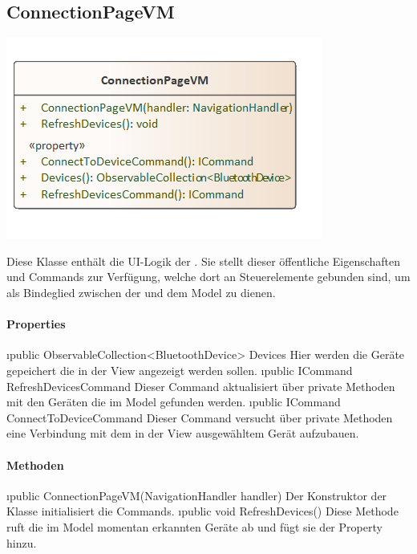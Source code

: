 \documentclass[../entwurf.tex]{subfiles}
\begin{document}
\subsection{ConnectionPageVM}
\begin{minipage}{0.5\textwidth}
\includegraphics[scale=0.75]{../graphics/vm_klassen/ConnectionPageVM.png}
\end{minipage}
\begin{minipage}{0.5\textwidth}
Diese Klasse enthält die UI-Logik der . Sie stellt dieser öffentliche Eigenschaften und Commands zur Verfügung, welche dort an Steuerelemente gebunden sind, um als Bindeglied zwischen der  und dem Model zu dienen.
\end{minipage}
\paragraph{Properties}
\begin{itemize}
	\i{public ObservableCollection<BluetoothDevice> Devices} Hier werden die Geräte gepeichert die in der View angezeigt werden sollen. 
	\i{public ICommand RefreshDevicesCommand} Dieser Command aktualisiert über private Methoden  mit den Geräten die im Model gefunden werden. 
	\i{public ICommand ConnectToDeviceCommand} Dieser Command versucht über private Methoden eine Verbindung mit dem in der View ausgewähltem Gerät aufzubauen. 
\end{itemize}
\paragraph{Methoden}
\begin{itemize}
	\i{public ConnectionPageVM(NavigationHandler handler)} Der Konstruktor der Klasse initialisiert die Commands.
	\i{public void RefreshDevices()} Diese Methode ruft die im Model momentan erkannten Geräte ab und fügt sie der Property  hinzu.
\end{itemize}
\end{document}
